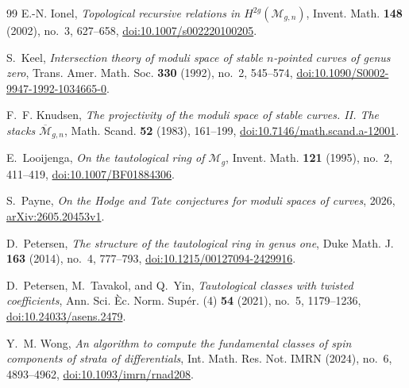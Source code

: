 \documentclass[12pt,reqno]{amsart}
\theoremstyle{definition}
\theoremstyle{remark}
\begin{document}
\begin{thebibliography}{99}
E.-N. Ionel,
\emph{Topological recursive relations in $H^{2g}(\mathcal M_{g,n})$},
Invent. Math. \textbf{148} (2002), no.~3, 627--658,
\href{https://doi.org/10.1007/s002220100205}
{doi:10.1007/s002220100205}.

S.~Keel,
\emph{Intersection theory of moduli space of stable $n$-pointed curves of
genus zero},
Trans. Amer. Math. Soc. \textbf{330} (1992), no.~2, 545--574,
\href{https://doi.org/10.1090/S0002-9947-1992-1034665-0}
{doi:10.1090/S0002-9947-1992-1034665-0}.

F.~F. Knudsen,
\emph{The projectivity of the moduli space of stable curves. II. The stacks
$\overline{\mathcal M}_{g,n}$},
Math. Scand. \textbf{52} (1983), 161--199,
\href{https://doi.org/10.7146/math.scand.a-12001}
{doi:10.7146/math.scand.a-12001}.

E.~Looijenga,
\emph{On the tautological ring of $\mathcal M_g$},
Invent. Math. \textbf{121} (1995), no.~2, 411--419,
\href{https://doi.org/10.1007/BF01884306}
{doi:10.1007/BF01884306}.

S.~Payne,
\emph{On the Hodge and Tate conjectures for moduli spaces of curves},
2026,
\href{https://arxiv.org/abs/2605.20453}{arXiv:2605.20453v1}.

D.~Petersen,
\emph{The structure of the tautological ring in genus one},
Duke Math. J. \textbf{163} (2014), no.~4, 777--793,
\href{https://doi.org/10.1215/00127094-2429916}
{doi:10.1215/00127094-2429916}.

D.~Petersen, M.~Tavakol, and Q.~Yin,
\emph{Tautological classes with twisted coefficients},
Ann. Sci. \`Ec. Norm. Sup\'er. (4) \textbf{54} (2021), no.~5, 1179--1236,
\href{https://doi.org/10.24033/asens.2479}{doi:10.24033/asens.2479}.

Y.~M. Wong,
\emph{An algorithm to compute the fundamental classes of spin components
of strata of differentials},
Int. Math. Res. Not. IMRN (2024), no.~6, 4893--4962,
\href{https://doi.org/10.1093/imrn/rnad208}
{doi:10.1093/imrn/rnad208}.

\end{thebibliography}
\end{document}
